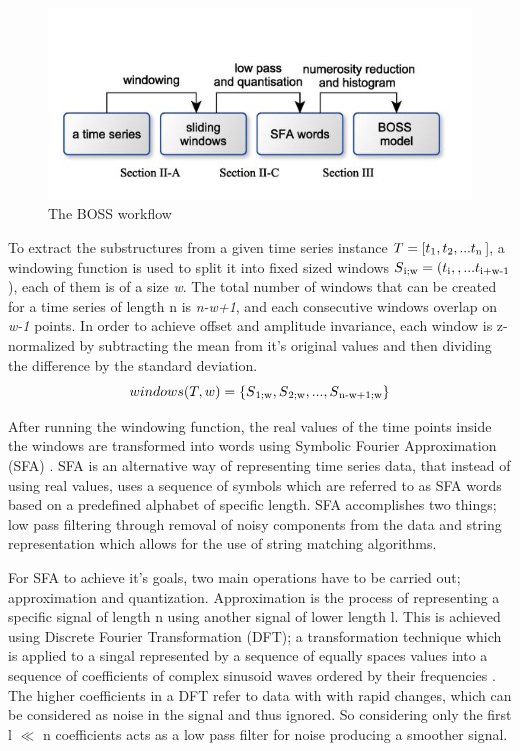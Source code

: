 \begin{figure}
    \captionsetup{justification=raggedright}
    \centering
    \includegraphics[scale = 0.5]{BossFlow.JPG}
    \centering
    \caption{The BOSS workflow \cite{schafer2015boss}}
    \label{Img:BossFlow}
\end{figure}

To extract the substructures from a given time series instance $T = [t\textsubscript{1},t\textsubscript{2},...t\textsubscript{n}$],
a windowing function is used to split it into fixed sized windows $S\textsubscript{i;w} = (t\textsubscript{i},,...t\textsubscript{i+w-1}$), each of them is of a size \emph{w}.
The total number of windows that can be created for a time series of length n is \emph{n-w+1}, and each consecutive windows overlap on \emph{w-1} points.
In order to achieve offset and amplitude invariance, each window is z-normalized by subtracting the mean from it's original values and then dividing the difference
by the standard deviation.
\begin{equation}
    windows(T,w) = \{ S\textsubscript{1;w}, S\textsubscript{2;w}, ...,  S\textsubscript{n-w+1;w} \}
\end{equation}

After running the windowing function, the real values of the time points inside the windows are transformed into words using Symbolic Fourier Approximation (SFA) \cite{schafer2012sfa}.
SFA is an alternative way of representing time series data, that instead of using real values, uses a sequence of symbols which are referred to as SFA words based on a predefined alphabet of specific length.
SFA accomplishes two things; low pass filtering through removal of noisy components from the data and string representation which allows for the use of string matching algorithms.

For SFA to achieve it's goals, two main operations have to be carried out; approximation and quantization.
Approximation is the process of representing a specific signal of length n using another signal of lower length l.
This is achieved using Discrete Fourier Transformation (DFT); a transformation technique which is applied to a singal represented by a sequence of equally spaces values
into a sequence of coefficients of complex sinusoid waves ordered by their frequencies \cite{liao2017separable}. The higher coefficients in a DFT refer to data with
with rapid changes, which can be considered as noise in the signal and thus ignored. So considering only the first l $\ll$ n coefficients acts as a low pass filter for noise
producing a smoother signal.


